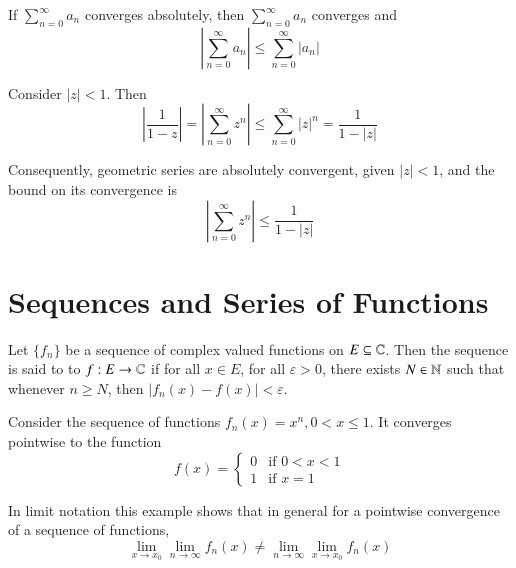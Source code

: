 \begin{theorem}
    If $\sum_{n=0}^{\infty}a_n$ converges absolutely, then $\sum_{n=0}^{\infty}a_n$ converges and \begin{equation*}
        \left|\sum_{n=0}^{\infty}a_n\right| \leq \sum_{n=0}^{\infty}|a_n|
    \end{equation*}
\end{theorem}


\begin{example}
    Consider $|z| < 1$. Then \begin{equation*}
        \left|\frac{1}{1-z}\right| = \left|\sum_{n=0}^{\infty}z^n\right| \leq \sum_{n=0}^{\infty}|z|^n = \frac{1}{1-|z|}
    \end{equation*}
\end{example}

Consequently, geometric series are absolutely convergent, given $|z| < 1$, and the bound on its convergence is \begin{equation*}
    \left|\sum_{n=0}^{\infty}z^n\right| \leq \frac{1}{1-|z|}
\end{equation*}



\section{Sequences and Series of Functions}

\begin{definition}
    Let $\{f_n\}$ be a sequence of complex valued functions on $E \subseteq \mathbb C$. Then the sequence is said to  to $f:E\rightarrow \mathbb C$ if for all $x \in E$, for all $\varepsilon > 0$, there exists $N \in \mathbb N$ such that whenever $n \geq N$, then $|f_n(x) - f(x)| < \varepsilon$.
\end{definition}

\begin{example}
    Consider the sequence of functions $f_n(x) = x^n, 0 < x \leq 1$. It converges pointwise to the function \begin{equation*}
        f(x) = \left\{\begin{array}{lc} 0 & \text{if } 0 < x < 1 \\ 1 & \text{if } x = 1\end{array}\right.
    \end{equation*}
\end{example}

In limit notation this example shows that in general for a pointwise convergence of a sequence of functions, $$\lim\limits_{x\rightarrow x_0}\lim\limits_{n\rightarrow \infty}f_n(x) \neq \lim\limits_{n\rightarrow \infty}\lim\limits_{x\rightarrow x_0}f_n(x)$$

